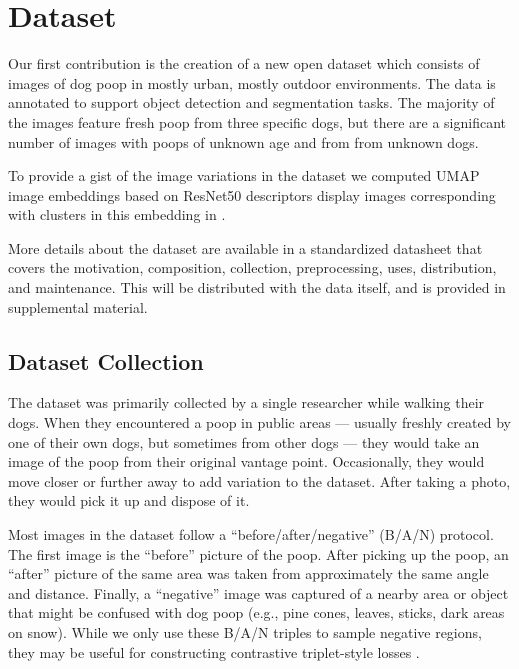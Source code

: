 \documentclass[10pt,twocolumn,letterpaper]{article}
\begin{document}


\section{Dataset}
\label{sec:dataset}

Our first contribution is the creation of a new open dataset which consists of images of dog poop in mostly
  urban, mostly outdoor environments.
The data is annotated to support object detection and segmentation tasks.
The majority of the images feature fresh poop from three specific dogs, but there are a significant number
  of images with poops of unknown age and from from unknown dogs.

To provide a gist of the image variations in the dataset we computed UMAP \cite{mcinnes_umap_2020} image
  embeddings based on ResNet50 \cite{he2016deep} descriptors display images
  corresponding with clusters in this embedding in .

More details about the dataset are available in a standardized datasheet
\cite{gebru_datasheets_2021} that covers the motivation, composition,
collection, preprocessing, uses, distribution, and maintenance. This will be
distributed with the data itself, and is provided in supplemental material.

\subsection{Dataset Collection}

The dataset was primarily collected by a single researcher while walking their dogs.
When they encountered a poop in public areas --- usually freshly created by one of their own dogs, but
  sometimes from other dogs --- they would take an image of the poop from their original vantage point.
Occasionally, they would move closer or further away to add variation to the dataset.
After taking a photo, they would pick it up and dispose of it.

Most images in the dataset follow a ``before/after/negative'' (B/A/N) protocol.
The first image is the ``before'' picture of the poop.
After picking up the poop, an ``after'' picture of the same area was taken from approximately the same angle
  and distance.
Finally, a ``negative'' image was captured of a nearby area or object that might be confused with dog poop
  (e.g., pine cones, leaves, sticks, dark areas on snow).
While we only use these B/A/N triples to sample negative regions, they may be useful for constructing
  contrastive triplet-style losses \cite{schroff_facenet_2015}.
\end{document}
